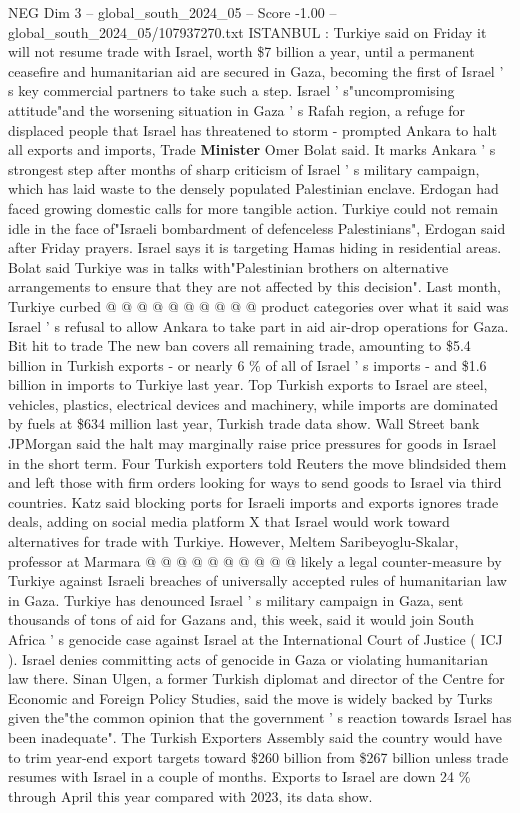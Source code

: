 \begin{textsample}{NEG Dim 3 – global\_south\_2024\_05 – Score -1.00 – global\_south\_2024\_05/107937270.txt}  \label{ex:f3_neg_365}
ISTANBUL : Turkiye said on Friday it will not resume trade with Israel, worth \$7 billion a year, until a permanent ceasefire and humanitarian aid are secured in Gaza, becoming the first of Israel ' s key commercial partners to take such a step.
Israel ' s"uncompromising attitude"and the worsening situation in Gaza ' s Rafah region, a refuge for displaced people that Israel has threatened to storm - prompted Ankara to halt all exports and imports, Trade \textbf{Minister} Omer Bolat said.
It marks Ankara ' s strongest step after months of sharp criticism of Israel ' s military campaign, which has laid waste to the densely populated Palestinian enclave.
Erdogan had faced growing domestic calls for more tangible action.
Turkiye could not remain idle in the face of"Israeli bombardment of defenceless Palestinians", Erdogan said after Friday prayers.
Israel says it is targeting Hamas hiding in residential areas.
Bolat said Turkiye was in talks with"Palestinian brothers on alternative arrangements to ensure that they are not affected by this decision".
Last month, Turkiye curbed @ @ @ @ @ @ @ @ @ @ product categories over what it said was Israel ' s refusal to allow Ankara to take part in aid air-drop operations for Gaza.
Bit hit to trade The new ban covers all remaining trade, amounting to \$5.4 billion in Turkish exports - or nearly 6 \% of all of Israel ' s imports - and \$1.6 billion in imports to Turkiye last year.
Top Turkish exports to Israel are steel, vehicles, plastics, electrical devices and machinery, while imports are dominated by fuels at \$634 million last year, Turkish trade data show.
Wall Street bank JPMorgan said the halt may marginally raise price pressures for goods in Israel in the short term.
Four Turkish exporters told Reuters the move blindsided them and left those with firm orders looking for ways to send goods to Israel via third countries.
Katz said blocking ports for Israeli imports and exports ignores trade deals, adding on social media platform X that Israel would work toward alternatives for trade with Turkiye.
However, Meltem Saribeyoglu-Skalar, professor at Marmara @ @ @ @ @ @ @ @ @ @ likely a legal counter-measure by Turkiye against Israeli breaches of universally accepted rules of humanitarian law in Gaza.
Turkiye has denounced Israel ' s military campaign in Gaza, sent thousands of tons of aid for Gazans and, this week, said it would join South Africa ' s genocide case against Israel at the International Court of Justice ( ICJ ).
Israel denies committing acts of genocide in Gaza or violating humanitarian law there.
Sinan Ulgen, a former Turkish diplomat and director of the Centre for Economic and Foreign Policy Studies, said the move is widely backed by Turks given the"the common opinion that the government ' s reaction towards Israel has been inadequate".
The Turkish Exporters Assembly said the country would have to trim year-end export targets toward \$260 billion from \$267 billion unless trade resumes with Israel in a couple of months.
Exports to Israel are down 24 \% through April this year compared with 2023, its data show.

\end{textsample}
